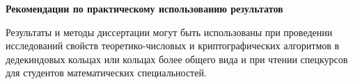 \documentclass[_00_autoref.tex]{subfiles}
\begin{document}
\centerline{\textbf{Рекомендации по практическому использованию результатов}}

Результаты и методы диссертации могут быть использованы при проведении исследований свойств теоретико-числовых и криптографических алгоритмов в дедекиндовых кольцах или кольцах более общего вида и при чтении спецкурсов для студентов математических специальностей.
\end{document}
